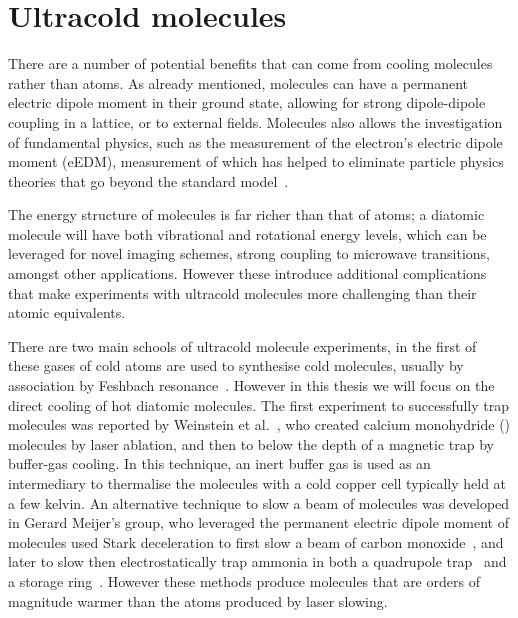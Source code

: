 \section{Ultracold molecules}

There are a number of potential benefits that can come from cooling molecules
rather than atoms. As already mentioned, molecules can have a permanent
electric dipole moment in their ground state, allowing for strong dipole-dipole
coupling in a lattice, or to external fields.
%
Molecules also allows the investigation of fundamental physics, such as the
measurement of the electron's electric dipole moment (eEDM), measurement of
which has helped to eliminate particle physics theories that go beyond the
standard model~\cite{ACMEreview}.

The energy structure of molecules is far richer than that of atoms; a diatomic
molecule will have both vibrational and rotational energy levels, which can be
leveraged for novel imaging schemes, strong coupling to microwave transitions,
amongst other applications. However these introduce additional complications
that make experiments with ultracold molecules more challenging than their
atomic equivalents.

There are two main schools of ultracold molecule experiments, in the first of
these gases of cold atoms are used to synthesise cold molecules, usually by
association by Feshbach resonance~\cite{Moses2017,PhysRevA.89.033604}. However
in this thesis we will focus on the direct cooling of hot diatomic molecules.
The first experiment to successfully trap molecules was reported by Weinstein
et al.~\cite{Weinstein1998}, who created calcium monohydride (\CaH{}) molecules
by laser ablation, and then to below the depth of a magnetic trap by buffer-gas
cooling. In this technique, an inert buffer gas is used as an intermediary to
thermalise the molecules with a cold copper cell typically held at a few
kelvin.
%
An alternative technique to slow a beam of molecules was developed in Gerard
Meijer's group, who leveraged the permanent electric dipole moment of molecules
used Stark deceleration to first slow a beam of carbon
monoxide~\cite{Bethlem1999}, and later to slow then electrostatically trap
ammonia in both a quadrupole trap~\cite{Bethlem2000} and a storage
ring~\cite{Crompvoets2001, Crompvoets2005}. However these methods produce
molecules that are orders of magnitude warmer than the atoms produced by laser
slowing.

